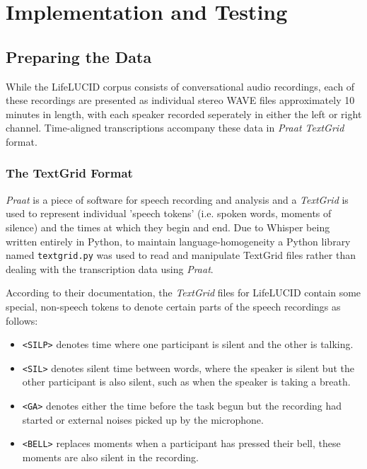 \chapter{Implementation and Testing}\label{ch:implementation-and-testing}

\section{Preparing the Data}

While the LifeLUCID corpus\cite{lifelucid} consists of conversational audio recordings, each of these recordings are presented as individual stereo WAVE files approximately 10 minutes in length, with each speaker recorded seperately in either the left or right channel.
Time-aligned transcriptions accompany these data in \emph{Praat TextGrid} format.

\subsection{The TextGrid Format}

\emph{Praat} is a piece of software for speech recording and analysis\cite{praat} and a \emph{TextGrid} is used to represent individual 'speech tokens' (i.e. spoken words, moments of silence) and the times at which they begin and end.
Due to Whisper being written entirely in Python, to maintain language-homogeneity a Python library named \texttt{textgrid.py}\cite{textgridpy} was used to read and manipulate TextGrid files rather than dealing with the transcription data using \emph{Praat}.

According to their documentation, the \emph{TextGrid} files for LifeLUCID\cite{lifelucid} contain some special, non-speech tokens to denote certain parts of the speech recordings as follows:

\begin{itemize}
  \item \texttt{<SILP>} denotes time where one participant is silent and the other is talking.
  \item \texttt{<SIL>} denotes silent time between words, where the speaker is silent but the other participant is also silent, such as when the speaker is taking a breath.
  \item \texttt{<GA>} denotes either the time before the task begun but the recording had started or external noises picked up by the microphone. 
  \item \texttt{<BELL>} replaces moments when a participant has pressed their bell, these moments are also silent in the recording.
\end{itemize}

